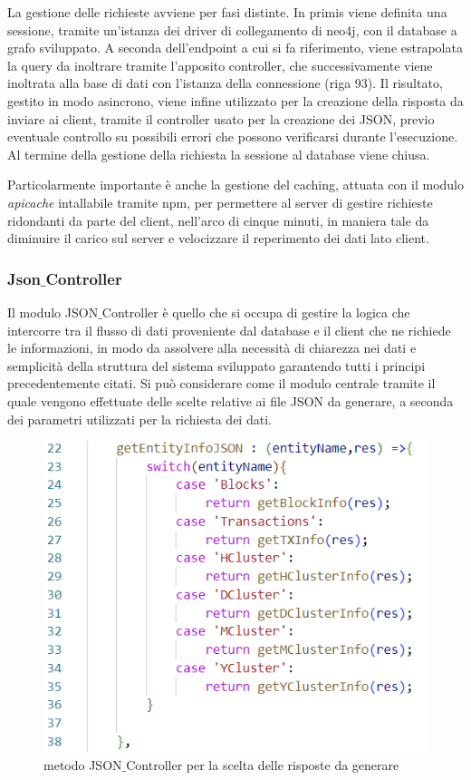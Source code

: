 \thispagestyle{mystyle}
La gestione delle richieste avviene per fasi distinte.
In primis viene definita una sessione, tramite un'istanza dei driver di collegamento di neo4j, con il database a grafo sviluppato.
A seconda dell'endpoint a cui si fa riferimento, viene estrapolata la query da inoltrare tramite l'apposito controller, che successivamente viene inoltrata alla base di dati con l'istanza della connessione (riga 93).
Il risultato, gestito in modo asincrono, viene infine utilizzato per la creazione della risposta da inviare ai client, tramite il controller usato per la creazione dei JSON, previo eventuale controllo su possibili errori che possono verificarsi durante l'esecuzione. Al termine della gestione della richiesta la sessione al database viene chiusa.

Particolarmente importante è anche la gestione del caching, attuata con il modulo \emph{apicache} intallabile tramite npm, per permettere al server di gestire richieste ridondanti da parte del client, nell'arco di cinque minuti, in maniera tale da diminuire il carico sul server e velocizzare il reperimento dei dati lato client.

\subsubsection{Json$\_$Controller}
Il modulo JSON$\_$Controller è quello che si occupa di gestire la logica che intercorre tra il flusso di dati proveniente dal database e il client che ne richiede le informazioni, in modo da assolvere alla necessità di chiarezza nei dati e semplicità della struttura del sistema sviluppato garantendo tutti i principi precedentemente citati.
Si può considerare come il modulo centrale tramite il quale vengono effettuate delle scelte relative ai file JSON da generare, a seconda dei parametri utilizzati per la richiesta dei dati.
\thispagestyle{mystyle}
\begin{figure}[H]
    \centering \includegraphics[keepaspectratio=true,scale=0.5]{Images/JSONControllerMethod.png}
    \caption{metodo JSON$\_$Controller per la scelta delle risposte da generare}
\end{figure}


